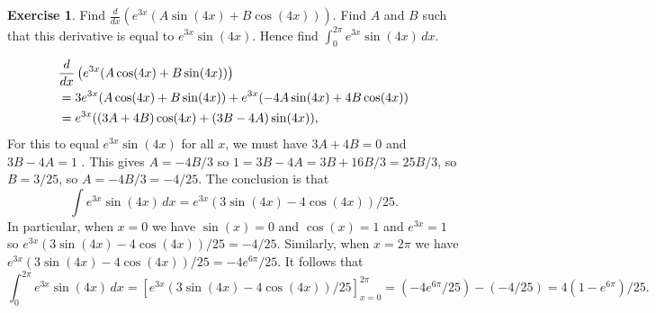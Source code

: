 \documentclass[a4paper]{amsart}
\theoremstyle{definition}
\newtheorem{exercise}{Exercise}[section]
\newenvironment{solution}{{\noindent \bf Solution:}}{}
\begin{document}
\begin{exercise}\label{ex-int-exp-trig-ii}
Find $\frac{d}{dx}(e^{3x}(A\sin(4x)+B\cos(4x)))$.  Find
  $A$ and $B$ such that this derivative is equal to
  $e^{3x}\sin(4x)$.  Hence find $\int_0^{2\pi} e^{3x}\sin(4x)\,dx$.
\end{exercise}
\begin{solution}
  \begin{align*}
   &
    \frac{d}{dx}\left(e^{3x}(A\cos(4x) + B\sin(4x))\right) \\
    &= 3e^{3x}(A\cos(4x) + B\sin(4x)) +
        e^{3x}(-4A\sin(4x) + 4B\cos(4x)) \\
    &= e^{3x}((3A+4B)\cos(4x) + (3B-4A)\sin(4x)) ,
  \end{align*}
  For this to equal $e^{3x}\sin(4x)$ for all $x$, we must have
  $3A+4B=0$ and $3B-4A=1$ \mk.  This gives $A=-4B/3$ so
  $1=3B-4A=3B+16B/3=25B/3$, so $B=3/25$, so $A=-4B/3=-4/25$.  The
  conclusion is that
  \[ \int e^{3x}\sin(4x)\,dx = e^{3x}(3\sin(4x) - 4\cos(4x))/25. \]
  In particular, when $x=0$ we have $\sin(x)=0$ and $\cos(x)=1$ and
  $e^{3x}=1$ so $e^{3x}(3\sin(4x)-4\cos(4x))/25=-4/25$.  Similarly,
  when $x=2\pi$ we have
  $e^{3x}(3\sin(4x)-4\cos(4x))/25=-4e^{6\pi}/25$.  It follows that 
  \[ \int_0^{2\pi} e^{3x}\sin(4x)\,dx = 
      \left[e^{3x}(3\sin(4x) - 4\cos(4x))/25\right]_{x=0}^{2\pi} = 
       (-4e^{6\pi}/25) - (-4/25) = 4(1-e^{6\pi})/25.
  \]
\end{solution}
\end{document}
